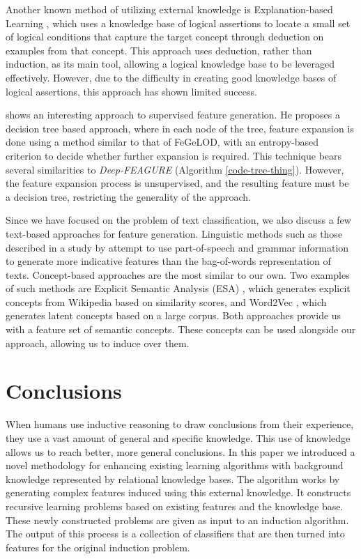 \documentclass[twoside,11pt]{article}
\theoremstyle{definition}
\begin{document}
Another known method of utilizing external knowledge is Explanation-based Learning , which uses a knowledge base of logical assertions to locate a small set of logical conditions that capture the target concept through deduction on examples from that concept. This approach uses deduction, rather than induction, as its main tool, allowing a logical knowledge base to be leveraged effectively.
However, due to the difficulty in creating good knowledge bases of logical assertions, this approach has shown limited success.

 shows an interesting approach to supervised feature generation. He proposes a decision tree based approach, where in each node of the tree, feature expansion is done using a method similar to that of FeGeLOD, with an entropy-based criterion to decide whether further expansion is required. This technique bears several similarities to \emph{Deep-FEAGURE} (Algorithm \ref{code-tree-thing}). However, the feature expansion process is unsupervised, and the resulting feature must be a decision tree, restricting the generality of the approach.

Since we have focused on the problem of text classification, we also discuss a few text-based approaches for feature generation. 
Linguistic methods such as those described in a study by  attempt to use part-of-speech and grammar information to generate more indicative features than the bag-of-words representation of texts.
Concept-based approaches are the most similar to our own. Two examples of such methods are Explicit Semantic Analysis (ESA) \cite{gabrilovich2009wikipediafull},  which generates explicit concepts from Wikipedia based on similarity scores, and Word2Vec , which generates latent concepts based on a large corpus. Both approaches provide us with a feature set of semantic concepts. These concepts can be used alongside our approach, allowing us to induce over them.

\section{Conclusions}

When humans use inductive reasoning to draw conclusions from their experience, they use a vast amount of general and specific knowledge. 
This use of knowledge allows us to reach better, more general conclusions.
In this paper we introduced a novel methodology for enhancing existing learning algorithms with background knowledge represented by relational knowledge bases.
The algorithm works by generating complex features induced using this external knowledge. It constructs recursive learning problems based on existing features and the knowledge base. These newly constructed problems are given as input to an induction algorithm. The output of this process is a collection of classifiers that are then turned into features for the original induction problem.
\end{document}
